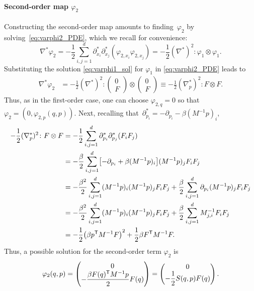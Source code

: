 \paragraph{Second-order map $\varphi_2$} Constructing the second-order map amounts to finding~$\varphi_2$ by solving~\eqref{eq:varphi2_PDE}, which we recall for convenience:
%
\begin{equation}
	\nabla^*\varphi_2 = -\frac{1}{2}\sum_{i,j=1}^d \partial_{x_i}^*\partial_{x_j}^* (\varphi_{2,x_i}\varphi_{2,x_j}) = -\frac{1}{2}(\nabla^*)^2 \colon \varphi_1\otimes \varphi_1.
\end{equation}
%
Substituting the solution \eqref{eq:varphi1_sol} for $\varphi_1$ in \eqref{eq:varphi2_PDE} leads to
%
\begin{align}
    \nabla^*\varphi_2 &= -\frac{1}{2}(\nabla^*)^2\colon 
    \begin{pmatrix}
        0 \\ F    
    \end{pmatrix} \otimes 
    \begin{pmatrix}
        0 \\ F    
    \end{pmatrix} \equiv -\frac{1}{2}(\nabla_p^*)^2 \colon F\otimes F.
\end{align}
%
Thus, as in the first-order case, one can choose $\varphi_{2,q} = 0$ so that $\varphi_2 = (0, \varphi_{2,p}(q,p))$. Next, recalling that~$\partial^*_{p_i} = -\partial_{p_i} - \beta (M^{-1}p)_i$,
%
\begin{align}
    -\frac{1}{2}(\nabla_p^*)^2 \colon F\otimes F &= -\frac{1}{2}\sum_{i,j=1}^d \partial_{p_i}^*\partial_{p_j}^* \paren*{F_i F_j} \\
    &= -\frac{\beta}{2}\sum_{i,j=1}^d \bkt*{-\partial_{p_i} + \beta (M^{-1}p)_i}(M^{-1}p)_j F_i F_j \\
    &= -\frac{\beta^2}{2}\sum_{i,j=1}^d (M^{-1}p)_i(M^{-1}p)_j F_i F_j + \frac{\beta}{2} \sum_{i,j=1}^d \partial_{p_i}(M^{-1}p)_j F_iF_j \\
    &= -\frac{\beta^2}{2}\sum_{i,j=1}^d (M^{-1}p)_i(M^{-1}p)_j F_i F_j +\frac{\beta}{2}\sum_{i,j=1}^d M^{-1}_{j,i} F_i F_j \\
    &= -\frac{1}{2}\paren*{\beta p^\t M^{-1}F}^2 + \frac{1}{2}\beta F^\t M^{-1}F.
\end{align}
%
Thus, a possible solution for the second-order term $\varphi_2$ is
%
\begin{equation}
    \varphi_2(q,p) = 
    \begin{pmatrix}
        0 \\ -\dfrac{\beta F(q)^\mathsf T M^{-1} p}{2}F(q)
    \end{pmatrix} = 
    \begin{pmatrix}
        0 \\ -\dfrac{1}{2}S(q,p)F(q)
    \end{pmatrix}.
\end{equation}
